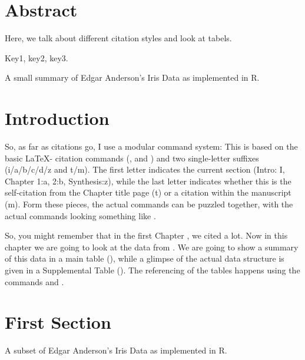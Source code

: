 \section*{Abstract}
\noindent
Here, we talk about different citation styles and look at tabels.

 Key1, key2, key3.

\begin{multicols}{2}

\begin{table*}[!htb]
\centering
\caption[Summary of Anderson's Iris Data]{\label{tab:c2t1}
A small summary of Edgar Anderson's Iris Data as implemented in R.}
\begin{small}

\end{small}
\end{table*}

\section{Introduction}

So, as far as citations go, I use a modular command system: This is based on the basic \LaTeX - citation commands (,  and ) and two single-letter suffixes (i/a/b/c/d/z and t/m). The first letter indicates the current section (Intro: I, Chapter 1:a, 2:b, Synthesis:z), while the last letter indicates whether this is the self-citation from the Chapter title page (t) or a citation within the manuscript (m).
Form these pieces, the actual commands can be puzzled together, with the actual commands looking something like .

So, you might remember that in the first Chapter , we cited  a lot.
Now in this chapter we are going to look at the data from .
We are going to show a summary of this data in a main table (), while a glimpse of the actual data structure is given in a Supplemental Table ().
The referencing of the tables happens using the commands  and .

\section{First Section}
\lipsum[7-9]

\begin{supplTable*}[!t]
\centering
\captionsetup{width=.6\linewidth}
\caption[Subset of Anderson's Iris Data]{\label{tab:c2st1}
A subset of Edgar Anderson's Iris Data as implemented in R.}
\begin{small}

\end{small}
\end{supplTable*}


\end{multicols}

